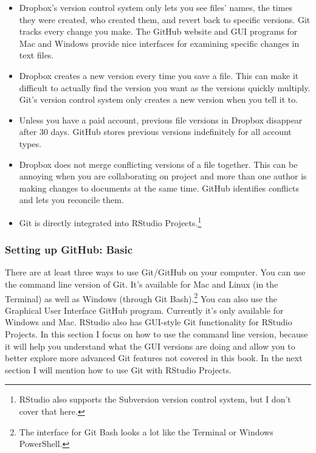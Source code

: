 \vspace{0.25cm}

\begin{itemize}
    \item Dropbox's version control system only lets you see files' names, the times they were created, who created them, and revert back to specific versions. Git tracks every change you make. The GitHub website and GUI programs for Mac and Windows provide nice interfaces for examining specific changes in text files.
    \item Dropbox creates a new version every time you save a file. This can make it difficult to actually find the version you want as the versions quickly multiply. Git's version control system only creates a new version when you tell it to.
    \item Unless you have a paid account, previous file versions in Dropbox disappear after 30 days. GitHub stores previous versions indefinitely for all account types.
    \item Dropbox does not merge conflicting versions of a file together. This can be annoying when you are collaborating on project and more than one author is making changes to documents at the same time. GitHub identifies conflicts and lets you reconcile them.
    \item Git is directly integrated into RStudio Projects.\footnote{RStudio also supports the Subversion version control system, but I don't cover that here.}
\end{itemize}

\subsubsection{Setting up GitHub: Basic}

There are at least three ways to use Git/GitHub on your computer. You can use the command line version of Git. It's available for Mac and Linux (in the Terminal) as well as Windows (through Git Bash).\footnote{The interface for Git Bash looks a lot like the Terminal or Windows PowerShell.} You can also use the Graphical User Interface GitHub program. Currently it's only available for Windows and Mac.  RStudio also has GUI-style Git functionality for RStudio Projects. In this section I focus on how to use the command line version, because it will help you understand what the GUI versions are doing and allow you to better explore more advanced Git features not covered in this book. In the next section I will mention how to use Git with RStudio Projects. 

